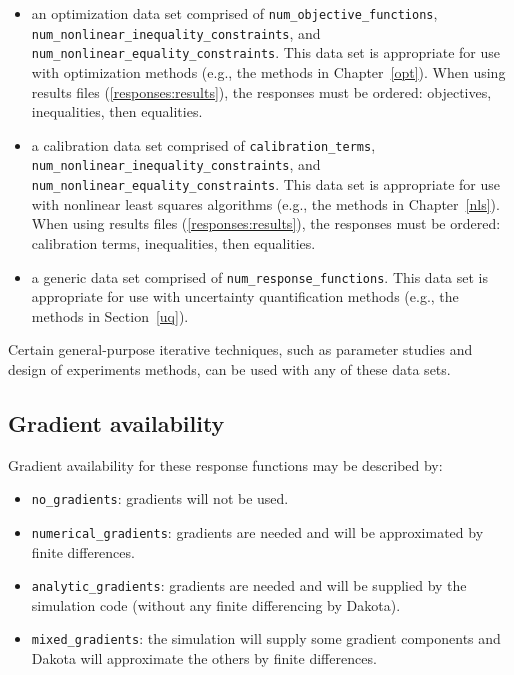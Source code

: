 \begin{itemize}

\item an optimization data set comprised of
  \texttt{num\_objective\_functions},\\
  \texttt{num\_nonlinear\_inequality\_constraints}, and
  \texttt{num\_nonlinear\_equality\_constraints}.  This data set is
  appropriate for use with optimization methods (e.g., the methods in
  Chapter~\ref{opt}).  When using results files
  (\ref{responses:results}), the responses must be ordered:
  objectives, inequalities, then equalities.
  
\item a calibration data set comprised of 
  \texttt{calibration\_terms},\\
  \texttt{num\_nonlinear\_inequality\_constraints}, and
  \texttt{num\_nonlinear\_equality\_constraints}.  This data set is
  appropriate for use with nonlinear least squares algorithms
  (e.g., the methods in Chapter~\ref{nls}).  When using results files
  (\ref{responses:results}), the responses must be ordered:
  calibration terms, inequalities, then equalities.
  
\item a generic data set comprised of \texttt{num\_response\_functions}.  
  This data set is appropriate for use with uncertainty quantification
  methods (e.g., the methods in Section~\ref{uq}).
  
\end{itemize}

Certain general-purpose iterative techniques, such as parameter
studies and design of experiments methods, can be used with any of
these data sets.

\subsection{Gradient availability}\label{responses:overview:gradient}

Gradient availability for these response functions may be described by:

\begin{itemize}

\item \texttt{no\_gradients}: gradients will not be used.

\item \texttt{numerical\_gradients}: gradients are needed and will
  be approximated by finite differences.

\item \texttt{analytic\_gradients}: gradients are needed and will be supplied
  by the simulation code (without any finite differencing by Dakota).

\item \texttt{mixed\_gradients}: the simulation will supply some gradient
  components and Dakota will approximate the others by finite
  differences.

\end{itemize}

